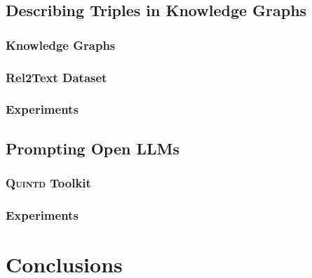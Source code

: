 \documentclass[12pt,notitlepage,a4paper,openright]{report}
\begin{document}
\section{Describing Triples in Knowledge Graphs}
\label{sec:describing}
\subsection{Knowledge Graphs}
\label{sec:kgs}
\subsection{Rel2Text Dataset}
\label{sec:rel2text}
\subsection{Experiments}
\label{sec:rel2text-exp}
\section{Prompting Open LLMs}
\label{sec:prompting}
\subsection{\textsc{Quintd} Toolkit}
\label{sec:quintd}
\subsection{Experiments}
\label{sec:quintd-exp}




\chapter{Conclusions}
\label{chap:conclusions}


%
%

\renewcommand{\chapterheadstartvskip}{\vspace*{0mm}} %

\cleardoublepage{}

{\small }

\cleardoublepage{}
\renewcommand*{\acronymname}{List of Abbreviations}
\printglossary[type=\acronymtype,style=index]

{\small \listoftables\par}

{\small \listoffigures\par}

\cleardoublepage{}

\end{document}

